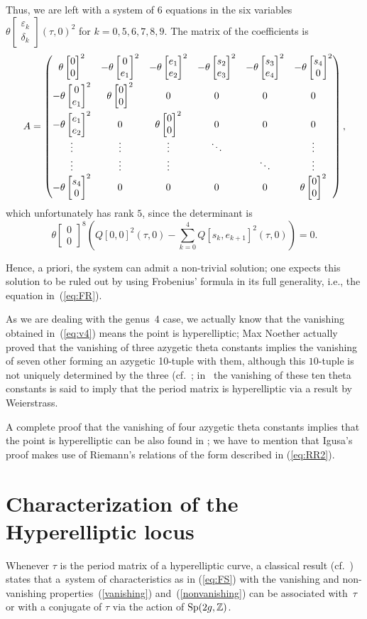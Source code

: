 \documentclass[pdftex]{sigma}
\numberwithin{equation}{section}
\newcommand{\de}{\delta}
\newcommand{\ep}{\varepsilon}
\newcommand{\ZZ}{{\mathbb{Z}}}
\def\ZZ{{\mathbb Z}}
\def\t{\theta}
\def\tt#1#2{{\t\left[\begin{matrix}{#1}\\ {#2}\end{matrix}\right]}}
\begin{document}
Thus, we are left with a system of 6 equations in the six variables
$\theta\left[\begin{smallmatrix}\ep_{k} \\ \de_{k} \end{smallmatrix}\right] (\tau, 0)^2$ for $ k=0, 5, 6, 7, 8, 9$. The matrix of the coefficients is
\begin{gather*}%
A= \left(\begin{matrix}
 \tt{0}{0}^2&-\tt{0}{e_{1}}^2 & -\tt{e_{1}}{e_{2}}^2 &- \tt{s_{2}}{e_{3}}^2 & -\tt{s_{3}}{e_{4}}^2&- \tt{s_{4}}{0}^2 \vspace{1mm}\\
 -\tt{0}{e_{1}}^2 & \tt{0}{0}^2 & 0 & 0& 0 & 0\vspace{1mm}\\
-\tt{e_{1}}{e_{2}}^2 &0& \tt{0}{0}^2 & 0 & 0& 0\\
\vdots&\vdots&\vdots&\ddots& &\vdots\\
\vdots&\vdots&\vdots& &\ddots&\vdots\\
- \tt{s_{4}}{0}^2& 0 & 0& 0 & 0& \tt{0}{0}^2 \\
 \end{matrix}\right),
\end{gather*}
which unfortunately has rank $5$, since the determinant is
\[
\tt{0}{0}^8\left( Q[0, 0]^2(\tau, 0)-\sum_{k=0}^4 Q[s_k, e_{k+1}]^2(\tau,0) \right)=0.
\]

Hence, a priori, the system can admit a non-trivial solution; one expects this solution to be ruled out by using Frobenius' formula in its full generality, i.e., the equation in~(\ref{eq:FR}).

As we are dealing with the genus~4 case, we actually know that the vanishing obtained in~(\ref{eq:v4}) means the point is hyperelliptic; Max Noether actually proved that the vanishing of three azygetic theta constants implies the vanishing of seven other forming an azygetic 10-tuple with them, although this $10$-tuple is not uniquely determined by the three (cf.~\cite[Section~14]{No}; in~\cite{No} the vanishing of these ten theta constants is said to imply that the period matrix is hyperelliptic via a result by Weierstrass.

A complete proof that the vanishing of four azygetic theta constants implies that the point is hyperelliptic can be also found in \cite{Igu}; we have to mention that Igusa's proof makes use of Riemann's relations of the form described in (\ref{eq:RR2}).

\section{Characterization of the Hyperelliptic locus}
Whenever $\tau$ is the period matrix of a hyperelliptic curve, a classical result (cf.~\cite{Th}) states that a~system of characteristics as in (\ref{eq:FS}) with the vanishing and non-vanishing properties~(\ref{vanishing}) and~(\ref{nonvanishing}) can be associated with~$\tau$ or with a conjugate of $\tau$ via the action of ${\rm Sp}(2g, \ZZ)$.
\end{document}
